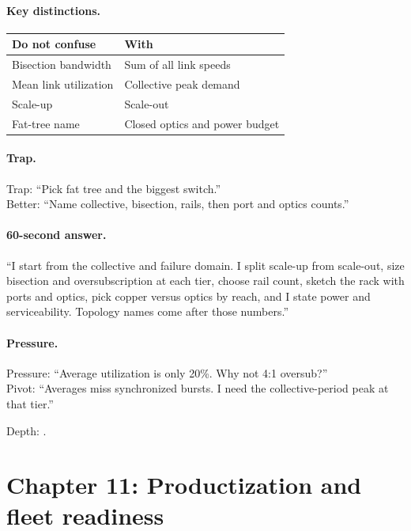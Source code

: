 \paragraph{Key distinctions.}
\begin{center}
\footnotesize
\begin{tabular}{@{}ll@{}}
\toprule
Do not confuse & With \\
\midrule
Bisection bandwidth & Sum of all link speeds \\
Mean link utilization & Collective peak demand \\
Scale-up & Scale-out \\
Fat-tree name & Closed optics and power budget \\
\bottomrule
\end{tabular}
\end{center}

\paragraph{Trap.}
Trap: ``Pick fat tree and the biggest switch.''\\
Better: ``Name collective, bisection, rails, then port and optics counts.''

\paragraph{60-second answer.}
``I start from the collective and failure domain. I split scale-up from
scale-out, size bisection and oversubscription at each tier, choose rail
count, sketch the rack with ports and optics, pick copper versus optics by
reach, and I state power and serviceability. Topology names come after those
numbers.''

\paragraph{Pressure.}
Pressure: ``Average utilization is only 20\%. Why not 4:1 oversub?''\\
Pivot: ``Averages miss synchronized bursts. I need the collective-period peak
at that tier.''

\footnotesize Depth:
.

\clearpage
\section{Chapter 11: Productization and fleet readiness}
\label{sec:cheat-productization}
\label{sec:cheat-ch7}
\label{sec:cheat-ch8}
\label{sec:cheat-ch9}
\label{sec:cheat-ch10}

